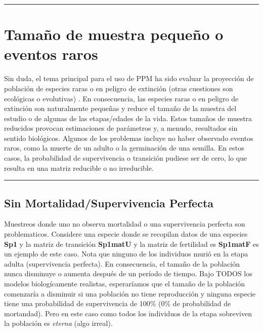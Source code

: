 \documentclass[
]{book}
\theoremstyle{definition}
\theoremstyle{definition}
\theoremstyle{definition}
\theoremstyle{definition}
\theoremstyle{remark}
\begin{document}
\begin{center}\rule{0.5\linewidth}{0.5pt}\end{center}

\section{Tamaño de muestra pequeño o eventos raros}\label{tamauxf1o-de-muestra-pequeuxf1o-o-eventos-raros}

Sin duda, el tema principal para el uso de PPM ha sido evaluar la proyección de población de especies raras o en peligro de extinción (otras cuestiones son ecológicas o evolutivas) \citep{caswell2000matrix, gascoigne2023standard}. En consecuencia, las especies raras o en peligro de extinción son naturalmente pequeñas y reduce el tamaño de la muestra del estudio o de algunas de las etapas/edades de la vida. Estos tamaños de muestra reducidos provocan estimaciones de parámetros y, a menudo, resultados sin sentido biológicos. Algunos de los problemas incluye no haber observado eventos raros, como la muerte de un adulto o la germinación de una semilla. En estos casos, la probabilidad de supervivencia o transición pudiese ser de cero, lo que resulta en una matriz reducible o no irreducible.

\begin{center}\rule{0.5\linewidth}{0.5pt}\end{center}

\subsection{Sin Mortalidad/Supervivencia Perfecta}\label{sin-mortalidadsupervivencia-perfecta}

Muestreos donde uno no observa mortalidad o una supervivencia perfecta son problematicos. Considere una especie donde se recopilan datos de una especies \textbf{Sp1} y la matriz de transición \textbf{Sp1matU} y la matriz de fertilidad es \textbf{Sp1matF} es un ejemplo de este caso. Nota que ninguno de los individuos murió en la etapa adulta (supervivencia perfecta). En consecuencia, el tamaño de la población nunca disminuye o aumenta después de un período de tiempo. Bajo TODOS los modelos biologícamente realistas, esperaríamos que el tamaño de la población comenzaría a disminuir si una población no tiene reproducción y ninguna especie tiene una probabilidad de supervivencia de 100\% (0\% de probabilidad de mortandad). Pero en este caso como todos los individuos de la etapa sobreviven la población es \emph{eterna} (algo irreal).
\end{document}
